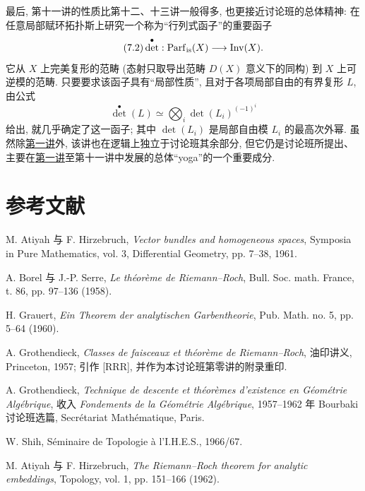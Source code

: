 最后, 第十一讲的性质比第十二、十三讲一般得多, 也更接近讨论班的总体精神: 在任意局部赋环拓扑斯上研究一个称为“行列式函子”的重要函子
\begin{equation}\tag{7.2}
\det^\bullet:\operatorname{Parf}_{\mathrm{is}}(X)\longrightarrow \operatorname{Inv}(X).
\end{equation}
它从 $X$ 上完美复形的范畴 (态射只取导出范畴 $D(X)$ 意义下的同构) 到 $X$ 上可逆模的范畴. 只要要求该函子具有“局部性质”, 且对于各项局部自由的有界复形 $L$, 由公式
\begin{equation}\tag{7.3}
\det^\bullet(L)\simeq\bigotimes_i \det(L_i)^{(-1)^i}
\end{equation}
给出, 就几乎确定了这一函子; 其中 $\det(L_i)$ 是局部自由模 $L_i$ 的最高次外幂. 虽然除\hyperlink{sga6.e01.expose}{第一讲}外, 该讲也在逻辑上独立于讨论班其余部分, 但它仍是讨论班所提出、主要在\hyperlink{sga6.e01.expose}{第一讲}至第十一讲中发展的总体“yoga”的一个重要成分.

\section*{参考文献}
\begin{enumerate}[label={[\arabic*]},leftmargin=2.5em]
\item M. Atiyah 与 F. Hirzebruch, \emph{Vector bundles and homogeneous spaces}, Symposia in Pure Mathematics, vol. 3, Differential Geometry, pp. 7--38, 1961.
\item A. Borel 与 J.-P. Serre, \emph{Le th\'eor\`eme de Riemann--Roch}, Bull. Soc. math. France, t. 86, pp. 97--136 (1958).
\item H. Grauert, \emph{Ein Theorem der analytischen Garbentheorie}, Pub. Math. no. 5, pp. 5--64 (1960).
\item A. Grothendieck, \emph{Classes de faisceaux et th\'eor\`eme de Riemann--Roch}, 油印讲义, Princeton, 1957; 引作 [RRR], 并作为本讨论班第零讲的附录重印.
\item A. Grothendieck, \emph{Technique de descente et th\'eor\`emes d'existence en G\'eom\'etrie Alg\'ebrique}, 收入 \emph{Fondements de la G\'eom\'etrie Alg\'ebrique}, 1957--1962 年 Bourbaki 讨论班选篇, Secr\'etariat Math\'ematique, Paris.
\item W. Shih, S\'eminaire de Topologie \`a l'I.H.E.S., 1966/67.
\item M. Atiyah 与 F. Hirzebruch, \emph{The Riemann--Roch theorem for analytic embeddings}, Topology, vol. 1, pp. 151--166 (1962).
\end{enumerate}
\clearpage

